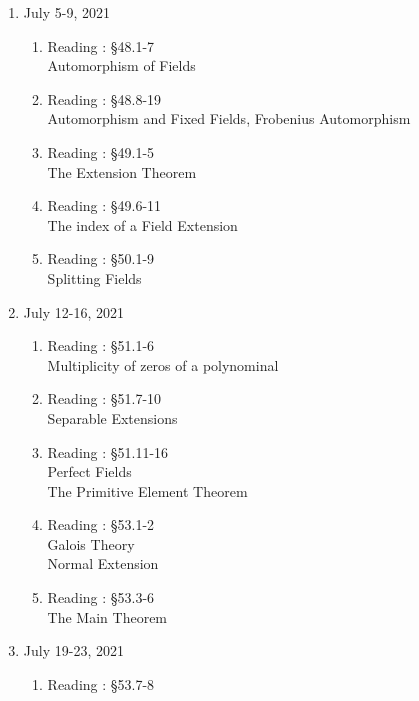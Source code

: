 \begin{enumerate}[label=Week \arabic*]
\begin{enumerate}[label=Day \arabic*]
		\item Reading : \S47.1-5\\
			Gaussian Integers
		\item Reading : \S47.6-10\\
			Multiplicative Norms
		\item First Internal Examination\\
			Module 1 \& 2
	\end{enumerate}
	\item July 5-9, 2021 %
	\begin{enumerate}[label=Day \arabic*]
		\item Reading : \S48.1-7\\
			Automorphism of Fields
		\item Reading : \S48.8-19\\
			Automorphism and Fixed Fields, 
			Frobenius Automorphism
		\item Reading : \S49.1-5\\
			The Extension Theorem
		\item Reading : \S49.6-11\\
			The index of a Field Extension
		\item  Reading : \S50.1-9\\
			Splitting Fields
	\end{enumerate}
	\item July 12-16, 2021 %
	\begin{enumerate}[label=Day \arabic*]
		\item Reading : \S51.1-6\\
			Multiplicity of zeros of a polynominal
		\item Reading : \S51.7-10 \\
			Separable Extensions
		\item Reading : \S51.11-16\\
			Perfect Fields\\
			The Primitive Element Theorem
		\item Reading : \S53.1-2\\
			Galois Theory\\
			Normal Extension
		\item Reading : \S53.3-6\\
			The Main Theorem
	\end{enumerate}
	\item July 19-23, 2021 %
	\begin{enumerate}[label=Day \arabic*]
		\item Reading : \S53.7-8\\

\end{enumerate}
\end{enumerate}
